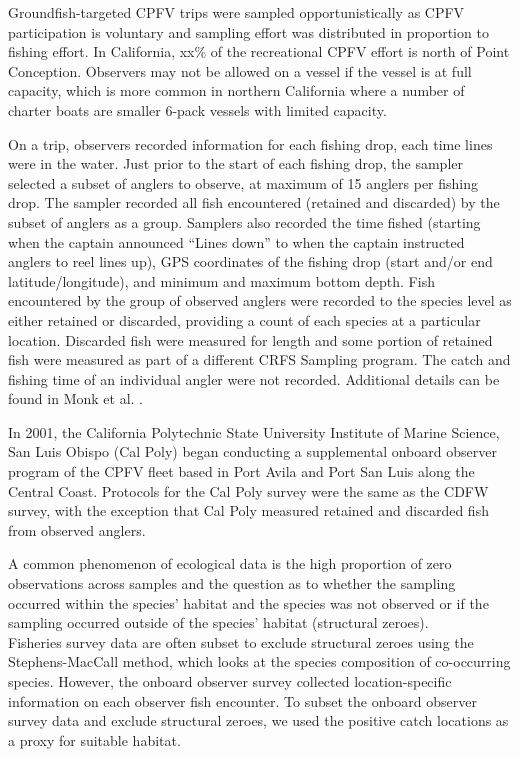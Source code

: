 \documentclass[preprint, 3p,
authoryear]{elsarticle} %
\begin{document}
Groundfish-targeted CPFV trips were sampled opportunistically as CPFV
participation is voluntary and sampling effort was distributed in
proportion to fishing effort. In California, xx\% of the recreational
CPFV effort is north of Point Conception. Observers may not be allowed
on a vessel if the vessel is at full capacity, which is more common in
northern California where a number of charter boats are smaller 6-pack
vessels with limited capacity.

On a trip, observers recorded information for each fishing drop, each
time lines were in the water. Just prior to the start of each fishing
drop, the sampler selected a subset of anglers to observe, at maximum of
15 anglers per fishing drop. The sampler recorded all fish encountered
(retained and discarded) by the subset of anglers as a group. Samplers
also recorded the time fished (starting when the captain announced
``Lines down'' to when the captain instructed anglers to reel lines up),
GPS coordinates of the fishing drop (start and/or end
latitude/longitude), and minimum and maximum bottom depth. Fish
encountered by the group of observed anglers were recorded to the
species level as either retained or discarded, providing a count of each
species at a particular location. Discarded fish were measured for
length and some portion of retained fish were measured as part of a
different CRFS Sampling program. The catch and fishing time of an
individual angler were not recorded. Additional details can be found in
Monk et al. \citeyearpar{Monk2014}.

In 2001, the California Polytechnic State University Institute of Marine
Science, San Luis Obispo (Cal Poly) began conducting a supplemental
onboard observer program of the CPFV fleet based in Port Avila and Port
San Luis along the Central Coast. Protocols for the Cal Poly survey were
the same as the CDFW survey, with the exception that Cal Poly measured
retained and discarded fish from observed anglers.

A common phenomenon of ecological data is the high proportion of zero
observations across samples and the question as to whether the sampling
occurred within the species' habitat and the species was not observed or
if the sampling occurred outside of the species' habitat (structural
zeroes).\\
Fisheries survey data are often subset to exclude structural zeroes
using the Stephens-MacCall method, which looks at the species
composition of co-occurring species. However, the onboard observer
survey collected location-specific information on each observer fish
encounter. To subset the onboard observer survey data and exclude
structural zeroes, we used the positive catch locations as a proxy for
suitable habitat.
\end{document}
